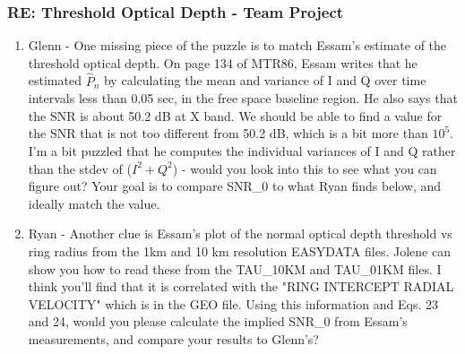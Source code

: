 \documentclass[crop=false,class=article,oneside]{standalone}
\begin{document}
\subsubsection{\footnotesize RE: Threshold Optical Depth - Team Project}
\begin{enumerate}
    \item Glenn - One missing piece of the puzzle is to match Essam's estimate of the threshold optical depth. On page 134 of MTR86, Essam writes that he estimated $\hat{P}_{n}$ by calculating the mean and variance of I and Q over time intervals less than 0.05 sec, in the free space baseline region. He also says that the SNR is about 50.2 dB at X band. We should be able to find a value for the SNR that is not too different from 50.2 dB, which is a bit more than $10^5$. I'm a bit puzzled that he computes the individual variances of I and Q rather than the stdev of ($I^2 + Q^2$) - would you  look into this to see what you can figure out? Your goal is to compare SNR\_0 to what Ryan finds below, and ideally match the value.
    \item Ryan -
    Another clue is Essam's plot of the normal optical depth threshold vs ring radius from the 1km and 10 km resolution EASYDATA files. Jolene can show you how to read these from the TAU\_10KM and TAU\_01KM files. I think you'll find that it is correlated with the "RING INTERCEPT RADIAL VELOCITY" which is in the GEO file. Using this information and Eqs. 23 and 24, would you please calculate the implied SNR\_0 from Essam's measurements, and compare your results to Glenn's?
\end{enumerate}
\end{document}
